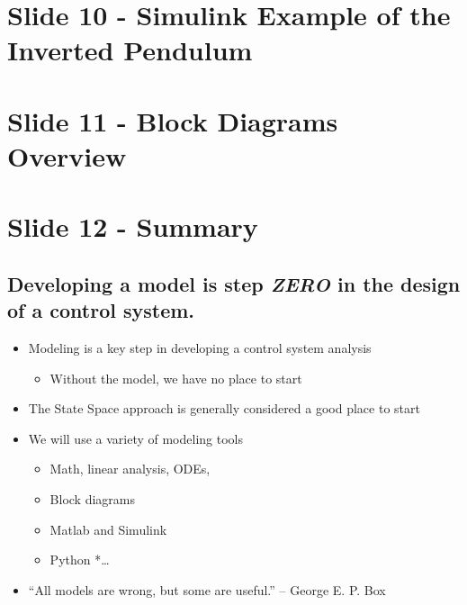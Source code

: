 \documentclass[
  letterpaper,
  DIV=11,
  numbers=noendperiod]{scrreprt}
\providecommand{\tightlist}{%
  \setlength{\itemsep}{0pt}\setlength{\parskip}{0pt}}
\begin{document}
\section{Slide 10 - Simulink Example of the Inverted
Pendulum}\label{slide-10---simulink-example-of-the-inverted-pendulum}

\section{Slide 11 - Block Diagrams
Overview}\label{slide-11---block-diagrams-overview}

\section{Slide 12 - Summary}\label{slide-12---summary}

\subsection{\texorpdfstring{Developing a model is step \emph{ZERO} in
the design of a control
system.}{Developing a model is step ZERO in the design of a control system.}}\label{developing-a-model-is-step-zero-in-the-design-of-a-control-system.}

\begin{itemize}
\tightlist
\item
  Modeling is a key step in developing a control system analysis

  \begin{itemize}
  \tightlist
  \item
    Without the model, we have no place to start
  \end{itemize}
\item
  The State Space approach is generally considered a good place to start
\item
  We will use a variety of modeling tools

  \begin{itemize}
  \tightlist
  \item
    Math, linear analysis, ODEs,
  \item
    Block diagrams
  \item
    Matlab and Simulink
  \item
    Python *\ldots{}
  \end{itemize}
\item
  ``All models are wrong, but some are useful.'' -- George E. P. Box
\end{itemize}
\end{document}
